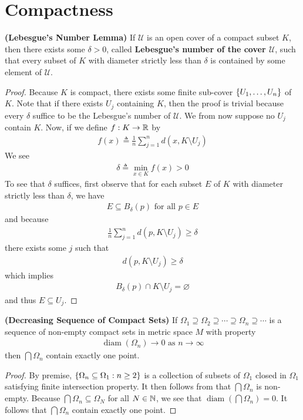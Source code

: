 \documentclass{report}
\begin{document}
\section{Compactness}
\begin{lemma}
\label{Lebesgue's Number Lemma}
\textbf{(Lebesgue's Number Lemma)} If $\mathcal{U}$ is an open cover of a compact subset $K$, then there exists some $\delta>0$, called \textbf{Lebesgue's number of the cover $\mathcal{U}$}, such that every subset of $K$  with diameter strictly less than $\delta$ is contained by some element of $\mathcal{U}$.  
\end{lemma}
\begin{proof}
Because $K$ is compact, there exists some finite sub-cover $\{ U_1,\dots ,U_n \}$ of $K$. Note that if there exists $U_j$ containing $K$, then the proof is trivial because every $\delta$ suffice to be the Lebesgue's number of $\mathcal{U}$. We from now suppose no $U_j$ contain  $K$. Now, if we define  $f:K\rightarrow \mathbb{R}$ by 
\begin{align*}
f(x)\triangleq \frac{1}{n}\sum_{j=1}^n d(x,K \setminus U_j)
\end{align*}
We see 
\begin{align*}
\delta \triangleq \min_{x\in K}f(x)>0
\end{align*}
To see that $\delta$ suffices, first observe that for each subset $E$ of $K$ with diameter strictly less than $\delta$, we have 
 \begin{align*}
E\subseteq B_\delta (p)\text{ for all }p \in E
\end{align*}
and because 
\begin{align*}
\frac{1}{n}\sum_{j=1}^n d(p,K\setminus U_j)\geq \delta
\end{align*}
there exists some $j$ such that 
\begin{align*}
d(p,K\setminus U_j)\geq \delta
\end{align*}
which implies 
\begin{align*}
B_\delta (p)\cap  K\setminus U_j = \varnothing
\end{align*}
and thus $E\subseteq U_j$. 
\end{proof}
\begin{theorem}
\label{DSoC}
\textbf{(Decreasing Sequence of Compact Sets)} If $\Omega_1 \supseteq \Omega_2 \supseteq \cdots \supseteq \Omega_n \supseteq \cdots$ is a sequence of non-empty compact sets in metric space $M$ with property
\begin{align*}
\operatorname{diam}(\Omega_n) \to 0\text{ as }n\to \infty
\end{align*}
then $\bigcap \Omega_n$ contain exactly one point.   
\end{theorem}
\begin{proof}
By premise, $\{ \Omega_n\subseteq \Omega_1:n\geq 2 \}$ is a collection of subsets of $\Omega_1$ closed in $\Omega_1$ satisfying finite intersection property. It then follows from  that $\bigcap \Omega_n$ is non-empty. Because $\bigcap \Omega_n \subseteq \Omega_N$ for all $N\in\mathbb{N}$, we see that  $\operatorname{diam}(\bigcap \Omega_n)=0$. It follows that $\bigcap \Omega_n$ contain exactly one point.    
\end{proof}
\end{document}
